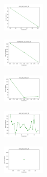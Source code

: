 \begin{figure}[H]
    \begin{subfigure}
        \centering
        \includegraphics[width=0.234\textwidth]{img/copkm/rand_set_const_10_277451237_cost.png}
    \end{subfigure}
    \hfill
    \begin{subfigure}
        \centering
        \includegraphics[width=0.234\textwidth]{img/copkm/newthyroid_set_const_10_277451237_cost.png}
    \end{subfigure}
    \hfill
    \begin{subfigure}
        \centering
        \includegraphics[width=0.234\textwidth]{img/copkm/iris_set_const_10_49258669_cost.png}
    \end{subfigure}
    \hfill
    \begin{subfigure}
        \centering
        \includegraphics[width=0.234\textwidth]{img/copkm/ecoli_set_const_10_49258669_cost.png}
    \end{subfigure}
    \hfill
    \begin{subfigure}
        \centering
        \includegraphics[width=0.234\textwidth]{img/copkm/rand_set_const_10_49258669_cost.png}
    \end{subfigure}
    \hfill
    \begin{subfigure}
        \centering

\end{subfigure}
\end{figure}
